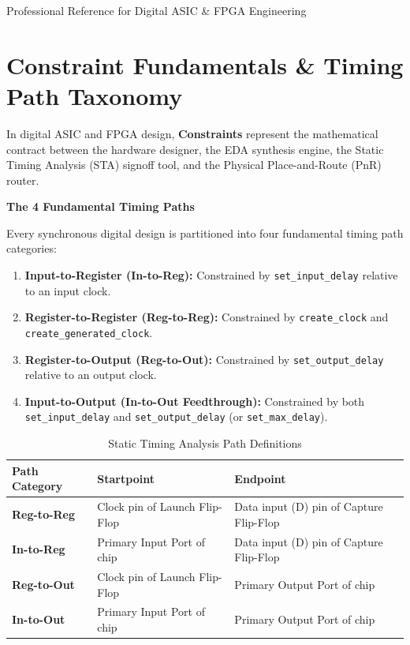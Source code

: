 \documentclass[11pt,a4paper]{article}
\newenvironment{formulabox}[1]{%
  \begin{mdframed}[style=formstyle]%
  {\bfseries\sffamily\color{primary}\small #1}\par\vspace{2pt}\small%
}{%
  \end{mdframed}%
}
\begin{document}
\begin{titlepage}
  \vfill
  {\small\sffamily\color{mutedgray} Professional Reference for Digital ASIC \& FPGA Engineering\par}
  \vspace*{0.5cm}
\end{titlepage}

\newpage
\tableofcontents
\newpage

\section{Constraint Fundamentals \& Timing Path Taxonomy}

In digital ASIC and FPGA design, \textbf{Constraints} represent the mathematical contract between the hardware designer, the EDA synthesis engine, the Static Timing Analysis (STA) signoff tool, and the Physical Place-and-Route (PnR) router.

\begin{formulabox}{The 4 Fundamental Timing Paths}
Every synchronous digital design is partitioned into four fundamental timing path categories:
\begin{enumerate}[leftmargin=1.5em]
  \item \textbf{Input-to-Register (In-to-Reg):} Constrained by \texttt{set\_input\_delay} relative to an input clock.
  \item \textbf{Register-to-Register (Reg-to-Reg):} Constrained by \texttt{create\_clock} and \texttt{create\_generated\_clock}.
  \item \textbf{Register-to-Output (Reg-to-Out):} Constrained by \texttt{set\_output\_delay} relative to an output clock.
  \item \textbf{Input-to-Output (In-to-Out Feedthrough):} Constrained by both \texttt{set\_input\_delay} and \texttt{set\_output\_delay} (or \texttt{set\_max\_delay}).
\end{enumerate}
\end{formulabox}

\begin{table}[h!]
  \centering\small
  \begin{tabular}{p{3.5cm} p{5.0cm} p{5.5cm}}
    \toprule
    \textbf{Path Category} & \textbf{Startpoint} & \textbf{Endpoint} \\
    \midrule
    \textbf{Reg-to-Reg} & Clock pin of Launch Flip-Flop & Data input (D) pin of Capture Flip-Flop \\
    \textbf{In-to-Reg} & Primary Input Port of chip & Data input (D) pin of Capture Flip-Flop \\
    \textbf{Reg-to-Out} & Clock pin of Launch Flip-Flop & Primary Output Port of chip \\
    \textbf{In-to-Out} & Primary Input Port of chip & Primary Output Port of chip \\
    \bottomrule
  \end{tabular}
  \caption{Static Timing Analysis Path Definitions}
\end{table}
\end{document}
